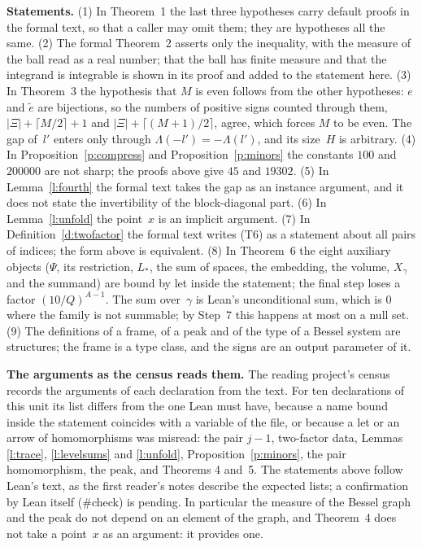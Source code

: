 \documentclass[11pt,a4paper]{article}
\newcommand{\leanfont}{\ttfamily\fontsize{8.6}{10.5}\selectfont\color{leancol}}
\newcommand{\m}[1]{\mbox{$#1$}}        %
\newcommand{\subhead}[1]{\par\addvspace{9pt plus 2pt}\Needspace{4\baselineskip}\noindent\textbf{#1}\enspace\ignorespaces}
\theoremstyle{plainx}
\theoremstyle{uprightx}
\newcommand{\abs}[1]{\lvert #1\rvert}
\newcommand{\lowk}[1]{\Lambda(#1)}                       %
\newcommand{\lf}[1]{{\leanfont #1}}
\begin{document}
\subhead{Statements.} (1) In Theorem~1 the last three hypotheses carry default proofs in the formal text, so that a
caller may omit them; they are hypotheses all the same. (2) The formal Theorem~2 asserts only the inequality,
with the measure of the ball read as a real number; that the ball has finite measure and that the integrand is
integrable is shown in its proof and added to the statement here. (3) In Theorem~3 the hypothesis that $M$ is
even follows from the other hypotheses: $e$ and $\tilde e$ are bijections, so the numbers of positive signs counted
through them, \m{\abs{\Xi}+\lceil M/2\rceil+1} and \m{\abs{\Xi}+\lceil(M+1)/2\rceil}, agree, which forces $M$ to be even.
The gap of~$l'$ enters only through \m{\lowk{-l'}=-\lowk{l'}}, and its size~$H$ is arbitrary. (4) In
Proposition~\ref{p:compress} and Proposition~\ref{p:minors} the constants $100$ and $200000$ are not sharp; the
proofs above give $45$ and $19302$. (5) In Lemma~\ref{l:fourth} the formal text takes the gap as an instance
argument, and it does not state the invertibility of the block-diagonal part. (6) In Lemma~\ref{l:unfold} the
point~$x$ is an implicit argument. (7) In Definition~\ref{d:twofactor} the formal text writes (T6) as a statement
about all pairs of indices; the form above is equivalent. (8) In Theorem~6 the eight auxiliary objects ($\Psi$, its
restriction, $L_*$, the sum of spaces, the embedding, the volume, $X_\gamma$ and the summand) are bound by
\lf{let} inside the statement; the final step loses a factor \m{(10/Q)^{A-1}}. The sum over~$\gamma$ is Lean's
unconditional sum, which is $0$ where the family is not summable; by Step~7 this happens at most on a null set.
(9) The definitions of a frame, of a peak and of the type of a Bessel system are structures; the frame is a
type class, and the signs are an output parameter of it.

\subhead{The arguments as the census reads them.} The reading project's census records the arguments of each
declaration from the text. For ten declarations of this unit its list differs from the one Lean must have, because
a name bound inside the statement coincides with a variable of the file, or because a \lf{let} or an arrow of
homomorphisms was misread: the pair $j-1$, two-factor data, Lemmas \ref{l:trace}, \ref{l:levelsums} and
\ref{l:unfold}, Proposition~\ref{p:minors}, the pair homomorphism, the peak, and Theorems 4 and~5. The statements
above follow Lean's text, as the first reader's notes describe the expected lists; a confirmation by Lean itself
(\lf{\#check}) is pending. In particular the measure of the Bessel graph and the peak do not depend on an element of
the graph, and Theorem~4 does not take a point~$x$ as an argument: it provides one.
\end{document}
